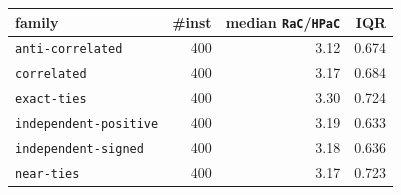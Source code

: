 \begin{tabular}{@{}lrrr@{}}
\toprule
family & \#inst & median \texttt{RaC}/\texttt{HPaC} & IQR \\
\midrule
\texttt{anti-correlated} & 400 & 3.12 & 0.674 \\
\texttt{correlated} & 400 & 3.17 & 0.684 \\
\texttt{exact-ties} & 400 & 3.30 & 0.724 \\
\texttt{independent-positive} & 400 & 3.19 & 0.633 \\
\texttt{independent-signed} & 400 & 3.18 & 0.636 \\
\texttt{near-ties} & 400 & 3.17 & 0.723 \\
\bottomrule
\end{tabular}
